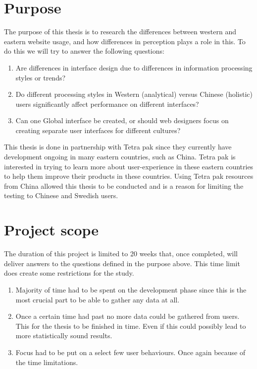 \section{Purpose}
The purpose of this thesis is to research the differences between western and eastern website usage, and how differences in perception plays a role in this. To do this we will try to answer the following questions:
 \begin{enumerate}
	\item Are differences in interface design due to differences in information processing styles or trends?
	\item Do different processing styles in Western (analytical) versus Chinese (holistic) users significantly affect performance on different interfaces?
	\item Can one Global interface be created, or should web designers focus on creating separate user interfaces for different cultures?
\end{enumerate}

This thesis is done in partnership with Tetra pak since they currently have development ongoing in many eastern countries, such as China. Tetra pak is interested in trying to learn more about user-experience in these eastern countries to help them improve their products in these countries. Using Tetra pak resources from China allowed this thesis to be conducted and is a reason for limiting the testing to Chinese and Swedish users. 

\section{Project scope}
The duration of this project is limited to 20 weeks that, once completed, will deliver answers to the questions defined in the purpose above. This time limit does create some restrictions for the study.
\begin{enumerate}
	\item Majority of time had to be spent on the development phase since this is the most crucial part to be able to gather any data at all.
	\item Once a certain time had past no more data could be gathered from users. This for the thesis to be finished in time. Even if this could possibly lead to more statistically sound results.
	\item Focus had to be put on a select few user behaviours. Once again because of the time limitations.
\end{enumerate}


